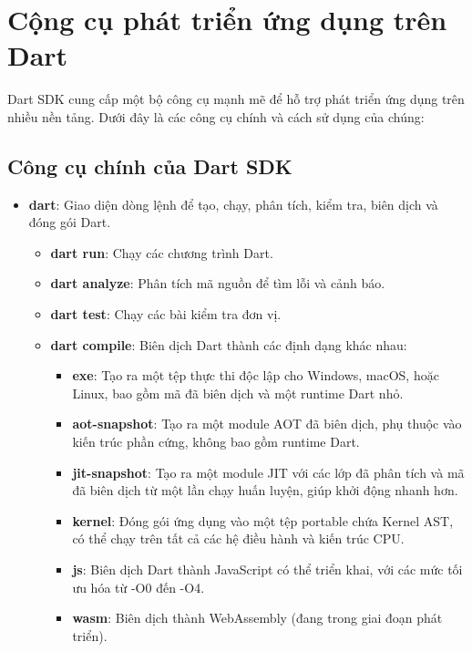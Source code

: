 \documentclass[../DoAn.tex]{subfiles}
\numberwithin{figure}{chapter}
\begin{document}
\section{Cộng cụ phát triển ứng dụng trên Dart}

Dart SDK cung cấp một bộ công cụ mạnh mẽ để hỗ trợ phát triển ứng dụng trên nhiều nền tảng. Dưới đây là các công cụ chính và cách sử dụng của chúng:

\subsection{Công cụ chính của Dart SDK}

\begin{itemize}
    \item \textbf{dart}: Giao diện dòng lệnh để tạo, chạy, phân tích, kiểm tra, biên dịch và đóng gói Dart.
    \begin{itemize}
        \item \textbf{dart run}: Chạy các chương trình Dart.
        \item \textbf{dart analyze}: Phân tích mã nguồn để tìm lỗi và cảnh báo.
        \item \textbf{dart test}: Chạy các bài kiểm tra đơn vị.
        \item \textbf{dart compile}: Biên dịch Dart thành các định dạng khác nhau:
        \begin{itemize}
            \item \textbf{exe}: Tạo ra một tệp thực thi độc lập cho Windows, macOS, hoặc Linux, bao gồm mã đã biên dịch và một runtime Dart nhỏ.
            \item \textbf{aot-snapshot}: Tạo ra một module AOT đã biên dịch, phụ thuộc vào kiến trúc phần cứng, không bao gồm runtime Dart.
            \item \textbf{jit-snapshot}: Tạo ra một module JIT với các lớp đã phân tích và mã đã biên dịch từ một lần chạy huấn luyện, giúp khởi động nhanh hơn.
            \item \textbf{kernel}: Đóng gói ứng dụng vào một tệp portable chứa Kernel AST, có thể chạy trên tất cả các hệ điều hành và kiến trúc CPU.
            \item \textbf{js}: Biên dịch Dart thành JavaScript có thể triển khai, với các mức tối ưu hóa từ -O0 đến -O4.
            \item \textbf{wasm}: Biên dịch thành WebAssembly (đang trong giai đoạn phát triển).
        \end{itemize}
    \end{itemize}

\end{itemize}
\end{document}
